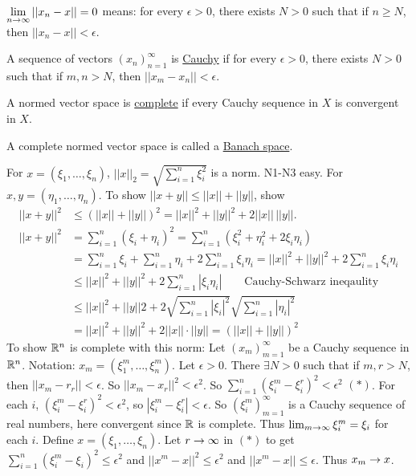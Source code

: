 \documentclass[]{article}
\begin{document}
\begin{recall}
	$\displaystyle\lim_{n\rightarrow\infty} ||x_n-x||=0$ means: for every $\epsilon>0$, there exists $N>0$ such that if $n\geq N$, then $||x_n-x||<\epsilon$.
\end{recall}

\begin{definition}
	A sequence of vectors $(x_n)_{n=1}^\infty$ is \ul{Cauchy} if for every $\epsilon>0$, there exists $N>0$ such that if $m,n>N$, then $||x_m-x_n||<\epsilon$.
\end{definition}
\begin{definition}
	A normed vector space is \ul{complete} if every Cauchy sequence in $X$ is convergent in $X$.
\end{definition}
\begin{definition}
	A complete normed vector space is called a \ul{Banach space}.
\end{definition}

\begin{example}
	[$X = \mb R^n$, with Euclidean norm $||\cdot ||_2$] For $x=(\xi_1,\dots,\xi_n)$, $||x||_2 = \sqrt{\sum_{i=1}^n \xi_i^2}$ is a norm. N1-N3 easy.
	For $x,y=(\eta_1,\dots,\eta_n)$.
	To show $||x+y|| \leq ||x||+||y||$, show
	\begin{align*}
		||x+y||^2 &\leq (||x||+||y||)^2 = ||x||^2 + ||y||^2 + 2 ||x||\,||y||. \\
		||x+y||^2 &= \sum_{i=1}^n (\xi_i+\eta_i)^2 
				  = \sum_{i=1}^n (\xi_i^2 + \eta_i^2 + 2\xi_i\eta_i) \\
				  &= \sum_{i=1}^n \xi_i + \sum_{i=1}^n \eta_i + 2\sum_{i=1}^n \xi_i\eta_i
				  = ||x||^2 + ||y||^2 + 2\sum_{i=1}^n \xi_i\eta_i \\
				  &\leq ||x||^2 + ||y||^2 + 2\sum_{i=1}^n |\xi_i\eta_i| \qquad \text{Cauchy-Schwarz ineqaulity}\\
				  &\leq ||x||^2 + ||y||2 + 2\sqrt{\sum_{i=1}^n|\xi_i|^2} \sqrt{\sum_{i=1}^n|\eta_i|^2} \\
				  &= ||x||^2 + ||y||^2 + 2||x||\cdot||y|| = (||x||+||y||)^2
	\end{align*}
	To show $\mathbb{R}^n$ is complete with this norm:
	Let $(x_m)_{m=1}^\infty$ be a Cauchy sequence in $\mathbb{R}^n$.
	Notation: $x_m = (\xi_1^m,\dots,\xi_n^m)$.
	Let $\epsilon>0$. There $\exists N>0$ such that if $m,r>N$, then $||x_m-r_r||<\epsilon$.
	So $||x_m-x_r||^2 < \epsilon^2$.
	So $\sum_{i=1}^n (\xi_i^m-\xi_i^r)^2 < \epsilon^2$ $(*)$.
	For each $i$, $(\xi_i^m-\xi_i^r)^2<\epsilon^2$, so $|\xi_i^m-\xi_i^r|<\epsilon$.
	So $(\xi_i^m)_{m=1}^\infty$ is a Cauchy sequence of real numbers, here convergent since $\mathbb{R}$ is complete.
	Thus $\lim_{m\rightarrow\infty} \xi_i^m = \xi_i$ for each $i$.
	Define $x = (\xi_1,\dots,\xi_n)$.
	Let $r\rightarrow\infty$ in $(*)$ to get $\sum_{i=1}^n(\xi_i^m-\xi_i)^2\leq\epsilon^2$ and $||x^m-x||^2 \leq \epsilon^2$ and $||x^m-x||\leq \epsilon$.
	Thus $x_m\rightarrow x$.
\end{example}
\end{document}
